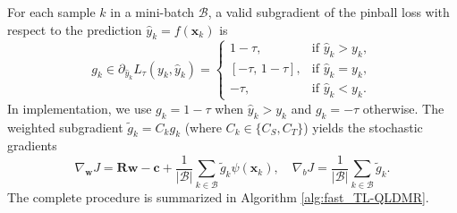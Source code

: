 \documentclass[a4paper]{cas-sc}
\begin{document}
For each sample $k$ in a mini-batch $\mathcal{B}$, a valid subgradient of the pinball loss with respect to the prediction $\hat{y}_k = f(\boldsymbol{x}_k)$ is
\begin{equation}
\label{eq:subgradient}
g_k \in \partial_{\hat{y}_k} L_{\tau}(y_k, \hat{y}_k)= \begin{cases}
    1-\tau, & \text{if } \hat{y}_k > y_k, \\
    [-\tau,\, 1-\tau], & \text{if } \hat{y}_k = y_k, \\
    -\tau, & \text{if } \hat{y}_k < y_k.
\end{cases}
\end{equation}
In implementation, we use $g_k = 1-\tau$ when $\hat{y}_k > y_k$ and $g_k = -\tau$ otherwise. The weighted subgradient $\tilde{g}_k = C_k g_k$ (where $C_k \in \{C_S, C_T\}$) yields the stochastic gradients
\begin{equation}
\label{eq:param_gradients}
\nabla_{\boldsymbol{w}} J = \boldsymbol{R} \boldsymbol{w} - \boldsymbol{c} + \frac{1}{|\mathcal{B}|} \sum_{k \in \mathcal{B}} \tilde{g}_k \psi(\boldsymbol{x}_k), \quad \nabla_b J = \frac{1}{|\mathcal{B}|} \sum_{k \in \mathcal{B}} \tilde{g}_k.
\end{equation}
The complete procedure is summarized in Algorithm \ref{alg:fast_TL-QLDMR}.
\end{document}
